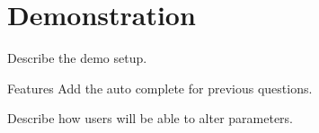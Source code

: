 
\section{Demonstration}

Describe the demo setup. 

Features
  Add the auto complete for previous questions.

Describe how users will be able to alter parameters.
